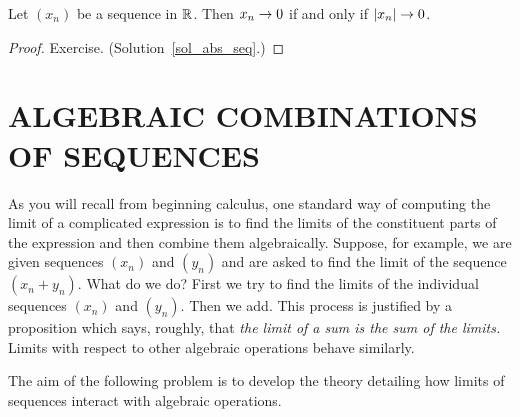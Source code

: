 \begin{prop}\label{abs_seq} Let $(x_n)$ be a sequence in $\mathbb{R}$. Then $x_n \rightarrow 0$ if and
only if $\lvert x_n\rvert \rightarrow 0$.
\end{prop}

\begin{proof} Exercise.  (Solution~\ref{sol_abs_seq}.)  \ns  \end{proof}








\section{ALGEBRAIC COMBINATIONS OF SEQUENCES}

As you will recall from beginning calculus, one standard way of computing the limit of a
complicated expression is to find the limits of the constituent parts of the expression and
then combine them algebraically.  Suppose, for example, we are given sequences $(x_n)$ and
$(y_n)$ and are asked to find the limit of the sequence $(x_n+y_n)$.  What do we do?  First we
try to find the limits of the individual sequences $(x_n)$ and  $(y_n)$.  Then we add.  This
process is justified by a proposition which says, roughly, that \emph{the limit of a sum is
the sum of the limits.} Limits with respect to other algebraic operations behave similarly.

The aim of the following problem is to develop the theory detailing how limits of sequences
interact with algebraic operations.

